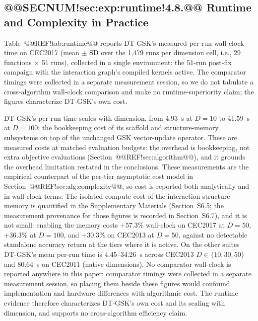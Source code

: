 \documentclass[10pt,a4paper]{article}
\newcommand{\dtgsk}{DT-GSK}
\begin{document}
\subsection{@@SECNUM!sec:exp:runtime!4.8.@@ Runtime and Complexity in Practice}\label{sec:exp:runtime}


Table~@@REF!tab:runtime@@ reports \dtgsk{}'s measured per-run wall-clock time on
CEC2017 (mean $\pm$ SD over the 1{,}479 runs per dimension cell, i.e., 29
functions $\times$ 51 runs), collected in a single environment: the 51-run
post-fix campaign with the interaction graph's compiled kernels active. The
comparator timings were collected in a separate measurement session, so we do
not tabulate a cross-algorithm wall-clock comparison and make no
runtime-superiority claim; the figures characterize \dtgsk{}'s own cost.


\dtgsk{}'s per-run time scales with dimension, from 4.93~s at $D = 10$ to
41.59~s at $D = 100$: the bookkeeping cost of its scaffold and
structure-memory subsystems on top of the unchanged GSK vector-update operator. These are
measured costs at matched evaluation budgets: the overhead is bookkeeping, not
extra objective evaluations (Section~@@REF!sec:algorithm@@), and it grounds the
overhead limitation restated in the conclusions. These measurements are the
empirical counterpart of the per-tier asymptotic cost model in
Section~@@REF!sec:alg:complexity@@, so cost is reported both analytically and in
wall-clock terms. The isolated compute cost of
the interaction-structure memory is quantified in the Supplementary Materials
(Section~S6.5; the measurement provenance for those figures is recorded in
Section~S6.7), and it is not small: enabling the memory costs $+57.3\%$
wall-clock on CEC2017 at $D = 50$, $+36.3\%$ at $D = 100$, and $+30.3\%$ on
CEC2013 at $D = 50$, against no detectable standalone accuracy return at the
tiers where it is active. On the other suites \dtgsk{}'s mean per-run time is
4.45--34.26~s across CEC2013 $D \in \{10, 30, 50\}$ and 80.64~s on CEC2011
(native dimensions). No comparator wall-clock is reported anywhere in this
paper: comparator timings were collected in a separate measurement session, so
placing them beside these figures would confound implementation and hardware
differences with algorithmic cost. The runtime evidence therefore characterizes
\dtgsk{}'s own cost and its scaling with dimension, and supports no
cross-algorithm efficiency claim.
\end{document}
